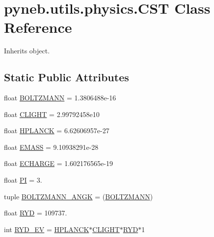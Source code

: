 \hypertarget{classpyneb_1_1utils_1_1physics_1_1_c_s_t}{}\section{pyneb.\+utils.\+physics.\+C\+S\+T Class Reference}
\label{classpyneb_1_1utils_1_1physics_1_1_c_s_t}


Inherits object.

\subsection*{Static Public Attributes}
\begin{DoxyCompactItemize}
\item 
float \hyperlink{classpyneb_1_1utils_1_1physics_1_1_c_s_t_aee0d21a1f9edd72e75c5369bd5bc36b9}{B\+O\+L\+T\+Z\+M\+A\+N\+N} = 1.\+3806488e-\/16
\item 
float \hyperlink{classpyneb_1_1utils_1_1physics_1_1_c_s_t_a316a5d8a7c983441bd40589f040f3a09}{C\+L\+I\+G\+H\+T} = 2.\+99792458e10
\item 
float \hyperlink{classpyneb_1_1utils_1_1physics_1_1_c_s_t_a00251eede3f56eadeb766c97f3144c55}{H\+P\+L\+A\+N\+C\+K} = 6.\+62606957e-\/27
\item 
float \hyperlink{classpyneb_1_1utils_1_1physics_1_1_c_s_t_a0131d55ea22f1ecb699a8d5dcf18e62e}{E\+M\+A\+S\+S} = 9.\+10938291e-\/28
\item 
float \hyperlink{classpyneb_1_1utils_1_1physics_1_1_c_s_t_affe8f9c45db60b472fb1779b6e88c43b}{E\+C\+H\+A\+R\+G\+E} = 1.\+602176565e-\/19
\item 
float \hyperlink{classpyneb_1_1utils_1_1physics_1_1_c_s_t_adeb7151ce462944ff7a0ff2803f873c3}{P\+I} = 3.
\item 
tuple \hyperlink{classpyneb_1_1utils_1_1physics_1_1_c_s_t_a7c0a4476149f179955c86bfdb63ade78}{B\+O\+L\+T\+Z\+M\+A\+N\+N\+\_\+\+A\+N\+G\+K} = (\hyperlink{classpyneb_1_1utils_1_1physics_1_1_c_s_t_aee0d21a1f9edd72e75c5369bd5bc36b9}{B\+O\+L\+T\+Z\+M\+A\+N\+N})
\item 
float \hyperlink{classpyneb_1_1utils_1_1physics_1_1_c_s_t_a468e4f9fac1fbd71b5ca458a84ae05cc}{R\+Y\+D} = 109737.
\item 
int \hyperlink{classpyneb_1_1utils_1_1physics_1_1_c_s_t_a337f87b4676ea337149e177d81b481e1}{R\+Y\+D\+\_\+\+E\+V} = \hyperlink{classpyneb_1_1utils_1_1physics_1_1_c_s_t_a00251eede3f56eadeb766c97f3144c55}{H\+P\+L\+A\+N\+C\+K}$\ast$\hyperlink{classpyneb_1_1utils_1_1physics_1_1_c_s_t_a316a5d8a7c983441bd40589f040f3a09}{C\+L\+I\+G\+H\+T}$\ast$\hyperlink{classpyneb_1_1utils_1_1physics_1_1_c_s_t_a468e4f9fac1fbd71b5ca458a84ae05cc}{R\+Y\+D}$\ast$1

\end{DoxyCompactItemize}
